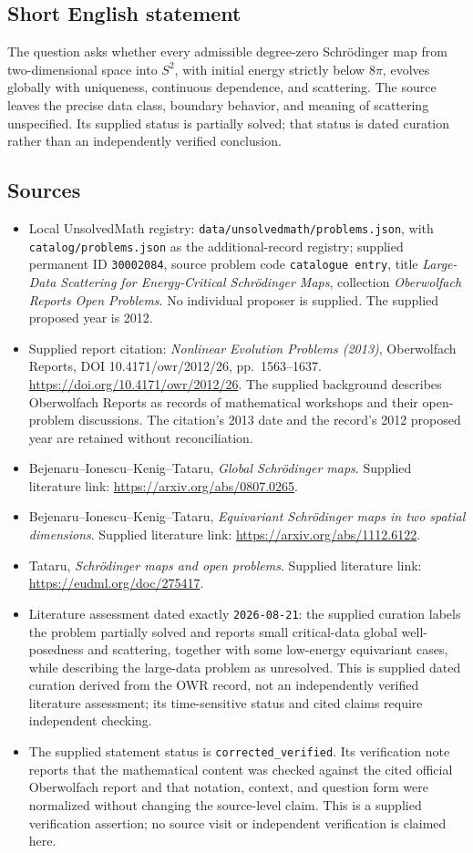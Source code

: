 \documentclass[11pt]{article}
\begin{document}
\subsection{Short English statement}
The question asks whether every admissible degree-zero Schrödinger map from two-dimensional space into $S^2$, with initial energy strictly below $8\pi$, evolves globally with uniqueness, continuous dependence, and scattering. The source leaves the precise data class, boundary behavior, and meaning of scattering unspecified. Its supplied status is partially solved; that status is dated curation rather than an independently verified conclusion.
\subsection{Sources}
\begin{itemize}
\item Local UnsolvedMath registry: \texttt{data/unsolvedmath/problems.json}, with \texttt{catalog/problems.json} as the additional-record registry; supplied permanent ID \texttt{30002084}, source problem code \texttt{catalogue entry}, title \emph{Large-Data Scattering for Energy-Critical Schrödinger Maps}, collection \emph{Oberwolfach Reports Open Problems}. No individual proposer is supplied. The supplied proposed year is 2012.
\item Supplied report citation: \emph{Nonlinear Evolution Problems (2013)}, Oberwolfach Reports, DOI 10.4171/owr/2012/26, pp.\ 1563--1637. \url{https://doi.org/10.4171/owr/2012/26}. The supplied background describes Oberwolfach Reports as records of mathematical workshops and their open-problem discussions. The citation's 2013 date and the record's 2012 proposed year are retained without reconciliation.
\item Bejenaru--Ionescu--Kenig--Tataru, \emph{Global Schrödinger maps}. Supplied literature link: \url{https://arxiv.org/abs/0807.0265}.
\item Bejenaru--Ionescu--Kenig--Tataru, \emph{Equivariant Schrödinger maps in two spatial dimensions}. Supplied literature link: \url{https://arxiv.org/abs/1112.6122}.
\item Tataru, \emph{Schrödinger maps and open problems}. Supplied literature link: \url{https://eudml.org/doc/275417}.
\item Literature assessment dated exactly \texttt{2026-08-21}: the supplied curation labels the problem partially solved and reports small critical-data global well-posedness and scattering, together with some low-energy equivariant cases, while describing the large-data problem as unresolved. This is supplied dated curation derived from the OWR record, not an independently verified literature assessment; its time-sensitive status and cited claims require independent checking.
\item The supplied statement status is \texttt{corrected\_verified}. Its verification note reports that the mathematical content was checked against the cited official Oberwolfach report and that notation, context, and question form were normalized without changing the source-level claim. This is a supplied verification assertion; no source visit or independent verification is claimed here.
\end{itemize}
\end{document}
